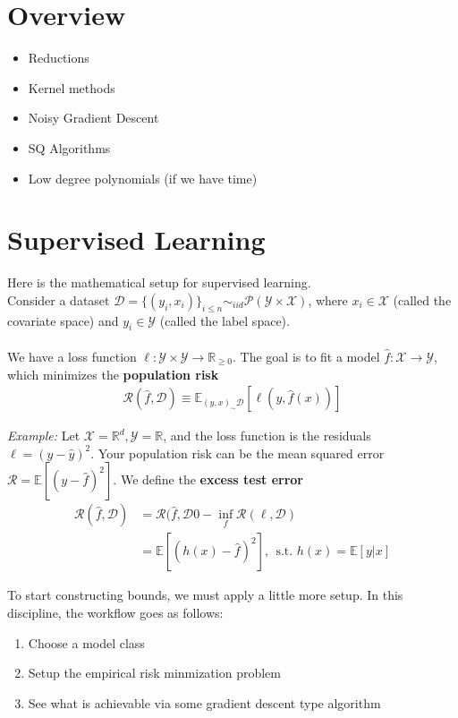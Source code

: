 \section{Overview}
\begin{itemize}
	\item Reductions
	\item Kernel methods
	\item Noisy Gradient Descent
	\item SQ Algorithms
	\item Low degree polynomials (if we have time)
\end{itemize}

\section{Supervised Learning}
Here is the mathematical setup for supervised learning.\\

Consider a dataset $\mathcal D=\{(y_i, x_i)\}_{i \leq n} \sim_{iid} \mathcal P(\mathcal Y \times \mathcal X)$, where $x_i \in \mathcal X$ (called the covariate space) and $y_i \in \mathcal Y$ (called the label space).\\
\\
We have a loss function $\ell : \mathcal Y \times \mathcal Y \to \mathbb R_{\geq 0}$. The goal is to fit a model $\hat f: \mathcal X \to \mathcal Y$, which minimizes the \textbf{population risk}
\begin{align}
	\mathcal R(\hat f, \mathcal D) \equiv \mathbb E_{(y,x)_\sim \mathcal D} [\ell (y, \hat f(x))]
\end{align}
\begin{sidework}
	\emph{Example:} Let $\mathcal X = \mathbb R^d, \mathcal Y = \mathbb R$, and the loss function is the residuals $\ell=  (y - \hat y)^2$. Your population risk can be the mean squared error $\mathcal R = \mathbb E[(y - \hat f)^2]$. 
	We define the \textbf{excess test error}
	\begin{align}
		\mathcal R(\hat f, \mathcal D) & = \mathcal R(\hat f, \mathcal D0 - \inf_{f} \mathcal R(\ell, \mathcal D)\\
		& = \mathbb E[(h(x) - \hat f)^2] , ~~\text{s.t. } h(x) = \mathbb E[y|x]
	\end{align}
\end{sidework}
To start constructing bounds, we must apply a little more setup. In this discipline, the workflow goes as follows:
\begin{enumerate}
	\item Choose a model class
	\item Setup the empirical risk minmization problem
	\item See what is achievable via some gradient descent type algorithm
\end{enumerate}


